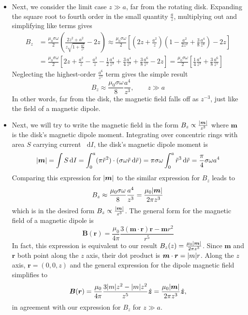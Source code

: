 \documentclass[11pt, a4paper]{article}
\newcommand{\diff}{\mathop{}\!\mathrm{d}} %
\renewcommand{\vec}[1]{\bm{#1}} %
\newcommand{\uvec}[1]{\hat{\vec{#1}}} %
\renewcommand{\t}[1]{\tilde{#1}} %
\renewcommand{\r}{\vec{r}}
\newcommand{\B}{\vec{B}} %
\newcommand{\m}{\vec{m}} %
\begin{document}
\begin{itemize}
	\item Next, we consider the limit case $ z \gg a $, far from the rotating disk. Expanding the square root to fourth order in the small quantity $ \frac{a}{z} $, multiplying out and simplifying like terms gives
	\begin{align*}
		B_{z} &= \frac{\mu_{0}\sigma \omega}{2} \left(\frac{2z^{2} + a^{2}}{z\sqrt{1 + \frac{a^{2}}{z^{2}}}} - 2z\right) \approx \frac{\mu_{0}\sigma \omega}{2} \left[\left(2z + \frac{a^{2}}{z}\right)\left(1 - \frac{a^{2}}{2z^{2}} + \frac{3}{8}\frac{a^{4}}{z^{4}}\right) - 2z \right]\\
		& = \frac{\mu_{0}\sigma \omega}{2} \left[2z + \frac{a^{2}}{z} - \frac{a^{2}}{z} - \frac{1}{2}\frac{a^{4}}{z^{3}} + \frac{3}{4}\frac{a^{4}}{z^{3}} + \frac{3}{8}\frac{a^{6}}{z^{5}} - 2z\right] = \frac{\mu_{0}\sigma \omega}{2} \left[ \frac{1}{4}\frac{a^{4}}{z^{3}} + \frac{3}{8}\frac{a^{6}}{z^{5}}\right] 
	\end{align*}
	Neglecting the highest-order $ \frac{a^{6}}{z^{5}} $ term gives the simple result
	\begin{equation*}
		B_{z} \approx  \frac{\mu_{0}\sigma \omega}{8} \frac{a^{4}}{z^{3}}, \qquad z \gg a
	\end{equation*}
	In other words, far from the disk, the magnetic field falls off as $ z^{-3} $, just like the field of a magnetic dipole.
	
	\item Next, we will try to write the magnetic field in the form $ B_{z} \propto \frac{\abs{\m}}{z^{3}} $ where $ \m $ is the disk's magnetic dipole moment. Integrating over concentric rings with area $ S $ carrying current $ \diff I $, the disk's magnetic dipole moment is
	\begin{equation*}
		\abs{\m} = \int S \diff I = \int_{0}^{a} (\pi \t{r}^{2}) \cdot (\sigma \omega \t{r}\diff \t{r}) = \pi \sigma \omega \int_{0}^{a} \t{r}^{3} \diff \t{r} = \frac{\pi}{4}\sigma \omega a^{4}
	\end{equation*}
	Comparing this expression for $ \abs{\m} $ to the similar expression for $ B_{z} $ leads to 
	\begin{equation*}
		B_{z} \approx  \frac{\mu_{0}\sigma \omega}{8} \frac{a^{4}}{z^{3}} = \frac{\mu_{0}\abs{\m}}{2\pi z^{3}}
	\end{equation*}	
	which is in the desired form $  B_{z} \propto \frac{\abs{\m}}{z^{3}} $. The general form for the magnetic field of a magnetic dipole is
	\begin{equation*}
		\B(\r) = \frac{\mu_{0}}{4\pi}\frac{3(\m \cdot \r)\r - \m r^{2}}{r^{5}}
	\end{equation*}
	In fact, this expression is equivalent to our result $ B_{z}(z) = \frac{\mu_{0}\abs{\m}}{2\pi z^{3}} $. Since $ \m $ and $ \r $ both point along the $ z $ axis, their dot product is $ \m \cdot \r = \abs{m}r $. Along the $ z $ axis, $ \r = (0, 0, z) $ and the general expression for the dipole magnetic field simplifies to
	\begin{equation*}
		\B(\r) = \frac{\mu_{0}}{4\pi} \frac{3\abs{m}z^{2} - \abs{m}z^{2}}{z^{5}}\uvec{z} = \frac{\mu_{0}\abs{\m}}{2\pi z^{3}} \uvec{z},
	\end{equation*}
	in agreement with our expression for $ B_{z} $ for $ z \gg a $.
	

\end{itemize}
\end{document}
